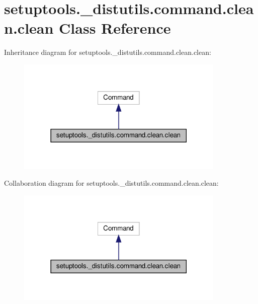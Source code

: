 \hypertarget{classsetuptools_1_1__distutils_1_1command_1_1clean_1_1clean}{}\section{setuptools.\+\_\+distutils.\+command.\+clean.\+clean Class Reference}
\label{classsetuptools_1_1__distutils_1_1command_1_1clean_1_1clean}


Inheritance diagram for setuptools.\+\_\+distutils.\+command.\+clean.\+clean\+:
\nopagebreak
\begin{figure}[H]
\begin{center}
\leavevmode
\includegraphics[width=282pt]{classsetuptools_1_1__distutils_1_1command_1_1clean_1_1clean__inherit__graph}
\end{center}
\end{figure}


Collaboration diagram for setuptools.\+\_\+distutils.\+command.\+clean.\+clean\+:
\nopagebreak
\begin{figure}[H]
\begin{center}
\leavevmode
\includegraphics[width=282pt]{classsetuptools_1_1__distutils_1_1command_1_1clean_1_1clean__coll__graph}
\end{center}
\end{figure}
